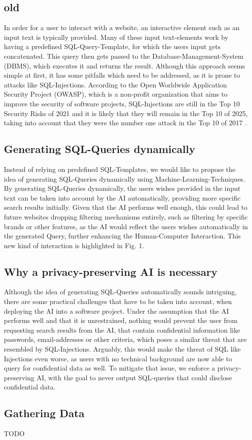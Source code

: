\documentclass[../../submission.tex]{subfiles}
\begin{document}
\subsection{old}
In order for a user to interact with a website, an interactive element such as 
an input text is typically provided. Many of these input text-elements work by
having a predefined SQL-Query-Template, for which the users input gets concatenated.
This query then gets passed to the Database-Management-System (DBMS), which executes
it and returns the result. Although this approach seems simple at first, it has 
some pitfalls which need to be addressed, as it is prone to attacks like SQL-Injections.
According to the Open Worldwide Application Security Project (OWASP), which is a 
non-profit organization that aims to improve the security of software projects,
SQL-Injections are still in the Top 10 Security Risks of 2021 and it is likely that 
they will remain in the Top 10 of 2025, taking into account that they were the number
one attack in the Top 10 of 2017 \cite{owaspfoundationOWASPTopTen2024}.
\subsection{Generating SQL-Queries dynamically}
Instead of relying on predefined SQL-Templates, we would like to propose the 
idea of generating SQL-Queries dynamically using Machine-Learning-Techniques.\\
By generating SQL-Queries dynamically, the users wishes provided in the input text can 
be taken into account by the AI automatically, providing more specific search results initially.
Given that the AI performs well enough, this could lead to future websites dropping 
filtering mechanisms entirely, such as filtering by specific brands or other features,
as the AI would reflect the users wishes automatically in the generated Query, 
further enhancing the Human-Computer Interaction. This new kind of interaction is highlighted
in Fig. 1.
\subsection{Why a privacy-preserving AI is necessary}
Although the idea of generating SQL-Queries automatically sounds intriguing, there 
are some practical challenges that have to be taken into account, when deploying the AI 
into a software project. Under the assumption
that the AI performs well and that it is unrestrained, nothing would prevent the user
from requesting search results from the AI, that contain confidential information like 
passwords, email-addresses or other criteria, which poses a similar threat that 
are resembled by SQL-Injections. Arguably, this would make the threat of SQL like 
Injections even worse, as users with no technical background are now able to query 
for confidential data as well. To mitigate that issue, we enforce a privacy-preserving AI,
with the goal to never output SQL-queries that could disclose confidential data.
\subsection{Gathering Data}
TODO
\end{document}

